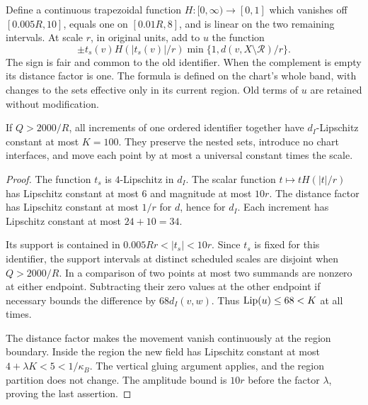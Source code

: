 Define a continuous trapezoidal function $H:[0,\infty)\to[0,1]$ which vanishes
off $[0.005R,10]$, equals one on $[0.01R,8]$, and is linear on the two
remaining intervals. At scale $r$, in original units, add to $u$ the
function
\begin{equation}\label{sec:increment-formula}
 \pm t_s(v) H(|t_s(v)|/r)
 \min\{1,d(v,X\setminus\mathcal R)/r\}.
\end{equation}
The sign is fair and common to the old identifier. When the complement is
empty its distance factor is one. The formula is defined on the chart's
whole band, with changes to the sets effective only in its current region.
Old terms of $u$ are retained without modification.

\begin{lemma}\label{sec:increment-bound}
If $Q>2000/R$, all increments of one ordered identifier together have
$d_I$-Lipschitz constant at most $K=100$. They preserve the nested sets,
introduce no chart interfaces, and move each point by at most a universal
constant times the scale.
\end{lemma}
\begin{proof}
The function $t_s$ is $4$-Lipschitz in $d_I$. The scalar function
$t\mapsto tH(|t|/r)$ has Lipschitz constant at most $6$ and magnitude
at most $10r$. The distance factor has Lipschitz constant at most $1/r$
for $d$, hence for $d_I$. Each increment has Lipschitz constant at most
$24+10=34$.

Its support is contained in
$0.005Rr<|t_s|<10r$. Since $t_s$ is fixed for this identifier, the
support intervals at distinct scheduled scales are disjoint when
$Q>2000/R$. In a comparison of two points at most two summands are
nonzero at either endpoint. Subtracting their zero values at the other
endpoint if necessary bounds the difference by $68d_I(v,w)$. Thus
$\operatorname{Lip}(u)\le68<K$ at all times.

The distance factor makes the movement vanish continuously at the region
boundary. Inside the region the new field has Lipschitz constant at most
$4+\lambda K<5<1/\kappa_B$. The vertical gluing argument applies, and
the region partition does not change. The amplitude bound is $10r$ before
the factor $\lambda$, proving the last assertion.
\end{proof}

